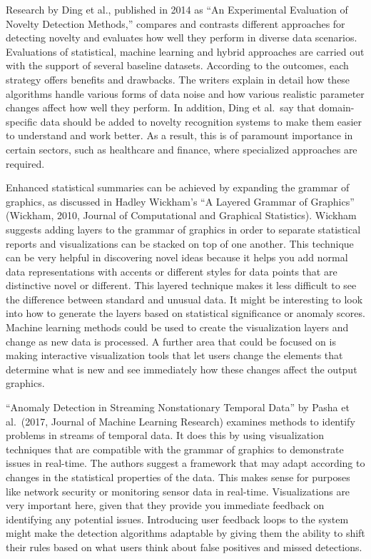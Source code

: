 \documentclass[print]{nuthesis}
\begin{document}
Research by Ding et al., published in 2014 as ``An Experimental Evaluation of Novelty Detection Methods,'' compares and contrasts different approaches for detecting novelty and evaluates how well they perform in diverse data scenarios.
Evaluations of statistical, machine learning and hybrid approaches are carried out with the support of several baseline datasets.
According to the outcomes, each strategy offers benefits and drawbacks.
The writers explain in detail how these algorithms handle various forms of data noise and how various realistic parameter changes affect how well they perform.
In addition, Ding et al.~say that domain-specific data should be added to novelty recognition systems to make them easier to understand and work better.
As a result, this is of paramount importance in certain sectors, such as healthcare and finance, where specialized approaches are required.

Enhanced statistical summaries can be achieved by expanding the grammar of graphics, as discussed in Hadley Wickham's ``A Layered Grammar of Graphics'' (Wickham, 2010, Journal of Computational and Graphical Statistics).
Wickham suggests adding layers to the grammar of graphics in order to separate statistical reports and visualizations can be stacked on top of one another.
This technique can be very helpful in discovering novel ideas because it helps you add normal data representations with accents or different styles for data points that are distinctive novel or different.
This layered technique makes it less difficult to see the difference between standard and unusual data.
It might be interesting to look into how to generate the layers based on statistical significance or anomaly scores.
Machine learning methods could be used to create the visualization layers and change as new data is processed.
A further area that could be focused on is making interactive visualization tools that let users change the elements that determine what is new and see immediately how these changes affect the output graphics.

``Anomaly Detection in Streaming Nonstationary Temporal Data'' by Pasha et al.~(2017, Journal of Machine Learning Research) examines methods to identify problems in streams of temporal data.
It does this by using visualization techniques that are compatible with the grammar of graphics to demonstrate issues in real-time.
The authors suggest a framework that may adapt according to changes in the statistical properties of the data.
This makes sense for purposes like network security or monitoring sensor data in real-time.
Visualizations are very important here, given that they provide you immediate feedback on identifying any potential issues.
Introducing user feedback loops to the system might make the detection algorithms adaptable by giving them the ability to shift their rules based on what users think about false positives and missed detections.
\end{document}
